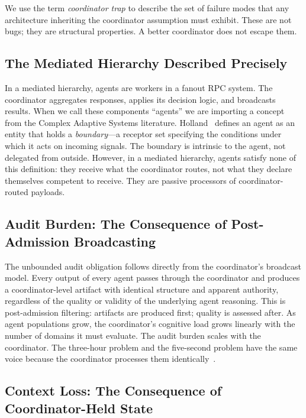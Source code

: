\documentclass[11pt]{article}
\begin{document}
We use the term \emph{coordinator trap} to describe the set of failure modes that
any architecture inheriting the coordinator assumption must exhibit. These are not
bugs; they are structural properties. A better coordinator does not escape them.

\subsection{The Mediated Hierarchy Described Precisely}

In a mediated hierarchy, agents are workers in a fanout RPC system. The
coordinator aggregates responses, applies its decision logic, and broadcasts
results. When we call these components ``agents'' we are importing a concept from
the Complex Adaptive Systems literature. Holland~\cite{holland} defines an agent
as an entity that holds a \emph{boundary}---a receptor set specifying the
conditions under which it acts on incoming signals. The boundary is intrinsic to
the agent, not delegated from outside. However, in a mediated hierarchy, agents satisfy
none of this definition: they receive what the coordinator routes, not what they
declare themselves competent to receive. They are passive processors of
coordinator-routed payloads.

\subsection{Audit Burden: The Consequence of Post-Admission Broadcasting}

The unbounded audit obligation follows directly from the coordinator's broadcast
model. Every output of every agent passes through the coordinator and produces a
coordinator-level artifact with identical structure and apparent authority,
regardless of the quality or validity of the underlying agent reasoning. This is
post-admission filtering: artifacts are produced first; quality is assessed after.
As agent populations grow, the coordinator's cognitive load grows linearly with
the number of domains it must evaluate. The audit burden scales with the
coordinator. The three-hour problem and the five-second problem have the same
voice because the coordinator processes them identically~\cite{signal-noise}.

\subsection{Context Loss: The Consequence of Coordinator-Held State}
\end{document}
